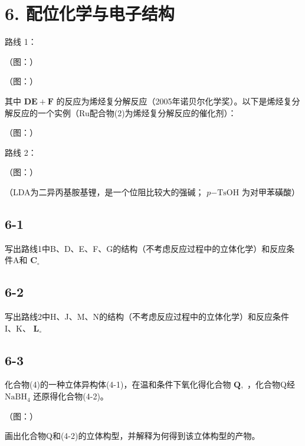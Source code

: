 \section*{6. 配位化学与电子结构}
路线 1：

（图：）

（图：）

其中 $\mathbf { D }  \mathbf { E } + \mathbf { F }$ 的反应为烯烃复分解反应（2005年诺⻉尔化学奖）。以下是烯烃复分解反应的⼀个实例（Ru配合物(2)为烯烃复分解反应的催化剂）：

（图：）

路线 2：

（图：）

（LDA为⼆异丙基胺基锂，是⼀个位阻⽐较⼤的强碱； $p { \mathrm { - } } \mathrm { T s O H }$ 为对甲苯磺酸）

\subsection*{6-1}
写出路线1中B、D、E、F、G的结构（不考虑反应过程中的⽴体化学）和反应条件A和 $\mathbf { C } _ { \circ }$

\subsection*{6-2}
写出路线2中H、J、M、N的结构（不考虑反应过程中的⽴体化学）和反应条件 I、K、 $\mathbf { L } _ { \circ }$

\subsection*{6-3}
化合物(4)的⼀种⽴体异构体(4-1)，在温和条件下氧化得化合物 $\mathbf { Q } ,$ ，化合物Q经 $\mathrm { N a B H _ { 4 } }$ 还原得化合物(4-2)。

（图：）

画出化合物Q和(4-2)的⽴体构型，并解释为何得到该⽴体构型的产物。
